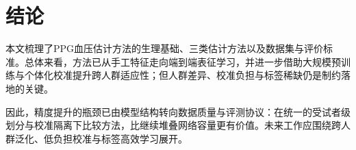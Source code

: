 
\section{结论}
\label{sec:conclusion}

本文梳理了PPG血压估计方法的生理基础、三类估计方法以及数据集与评价标准。总体来看，方法已从手工特征走向端到端表征学习，并进一步借助大规模预训练与个体化校准提升跨人群适应性；但人群差异、校准负担与标签稀缺仍是制约落地的关键。

因此，精度提升的瓶颈已由模型结构转向数据质量与评测协议：在统一的受试者级划分与校准隔离下比较方法，比继续堆叠网络容量更有价值。未来工作应围绕跨人群泛化、低负担校准与标签高效学习展开。